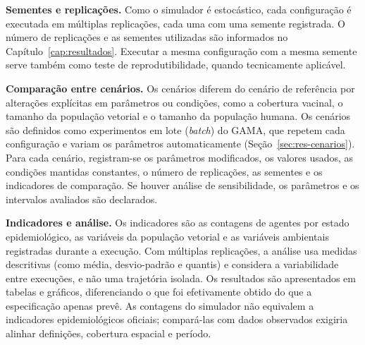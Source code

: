\textbf{Sementes e replicações.} Como o simulador é estocástico, cada configuração é executada em múltiplas replicações, cada uma com uma semente registrada. O número de replicações e as sementes utilizadas são informados no Capítulo~\ref{cap:resultados}. Executar a mesma configuração com a mesma semente serve também como teste de reprodutibilidade, quando tecnicamente aplicável.

\textbf{Comparação entre cenários.} Os cenários diferem do cenário de referência por alterações explícitas em parâmetros ou condições, como a cobertura vacinal, o tamanho da população vetorial e o tamanho da população humana. Os cenários são definidos como experimentos em lote (\textit{batch}) do GAMA, que repetem cada configuração e variam os parâmetros automaticamente (Seção~\ref{sec:res-cenarios}). Para cada cenário, registram-se os parâmetros modificados, os valores usados, as condições mantidas constantes, o número de replicações, as sementes e os indicadores de comparação. Se houver análise de sensibilidade, os parâmetros e os intervalos avaliados são declarados.

\textbf{Indicadores e análise.} Os indicadores são as contagens de agentes por estado epidemiológico, as variáveis da população vetorial e as variáveis ambientais registradas durante a execução. Com múltiplas replicações, a análise usa medidas descritivas (como média, desvio-padrão e quantis) e considera a variabilidade entre execuções, e não uma trajetória isolada. Os resultados são apresentados em tabelas e gráficos, diferenciando o que foi efetivamente obtido do que a especificação apenas prevê. As contagens do simulador não equivalem a indicadores epidemiológicos oficiais; compará-las com dados observados exigiria alinhar definições, cobertura espacial e período.